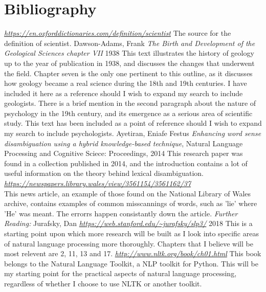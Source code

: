 \documentclass{article}
\begin{document}
\section{Bibliography}
\begin{thebibliography}{1}
 {\em \url{https://en.oxforddictionaries.com/definition/scientist}}
The source for the definition of scientist.
 Dawson-Adams, Frank {\em The Birth and Development of the Geological Sciences chapter VII} 1938
This text illustrates the history of geology up to the year of publication in 1938, and discusses the changes that underwent the field. Chapter seven is the only one pertinent to this outline, as it discusses how geology became a real science during the 18th and 19th centuries. I have included it here as a reference should I wish to expand my search to include geologists. 
There is a brief mention in the second paragraph about the nature of psychology in the 19th century, and its emergence as a serious area of scientific study. This text has been included as a point of reference should I wish to expand my search to include psychologists. 
 Ayetiran, Eniafe Festus {\em Enhancing word sense disambiguation using a hybrid knowledge-based technique}, Natural Language Processing and Cognitive Sciece: Proceedings, 2014
This research paper was found in a collection published in 2014, and the introduction contains a lot of useful information on the theory behind lexical disambiguation.
 {\em \url{https://newspapers.library.wales/view/3561154/3561162/37}}\\
This news article, an example of those found on the National Library of Wales archive, contains examples of common misscannings of words, such as 'lie' where 'He' was meant. The errorrs happen consistantly down the article.
{\em Further Reading: }
 Jurafsky, Dan {\em \url{https://web.stanford.edu/~jurafsky/slp3/}} 2018
This is a starting point upon which more research will be built as I look into specific areas of natural language processing more thoroughly. Chapters that I believe will be most relevent are 2, 11, 13 and 17.
 {\em \url{http://www.nltk.org/book/ch01.html}}
This book belongs to the Natural Language Toolkit, a NLP toolkit for Python. This will be my starting point for the practical aspects of natural language processing, regardless of whether I choose to use NLTK or another toolkit. 
\end{thebibliography}
\end{document}
